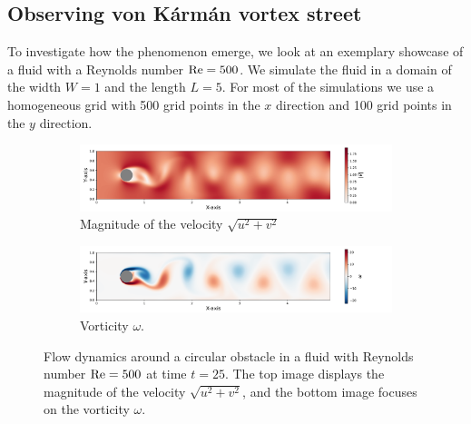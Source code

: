 \subsection{Observing von Kármán vortex street}
To investigate how the phenomenon emerge, we look at an exemplary showcase of a fluid with a Reynolds number $\mathrm{Re} = 500$. We simulate the fluid in a domain of the width $W = 1$ and the length $L = 5$. For most of the simulations we use a homogeneous grid with 500 grid points in the $x$ direction and 100 grid points in the $y$ direction.
\begin{figure}[!htb]
    \centering
    \hspace*{0.7cm}
    \begin{subfigure}[b]{\linewidth} %
        \includegraphics[width=\linewidth]{0_graphics/numeric/absV_25_sim.pdf}
        \caption{Magnitude of the velocity $\sqrt{u^2+v^2}$}
        \label{fig:abs_velocity_25}
    \end{subfigure}
    \vspace{1em} %
    \hspace*{0.7cm}
    \begin{subfigure}[b]{\linewidth} %
        \includegraphics[width=\linewidth]{0_graphics/numeric/vor_25_sim.pdf} %
        \caption{Vorticity $\omega$.}
        \label{fig:vorticity_25}
    \end{subfigure}
    \vspace{-15pt}
    \caption{Flow dynamics around a circular obstacle in a fluid with Reynolds number $\mathrm{Re} = 500$ at time $t=25$. The top image displays the magnitude of the velocity $\sqrt{u^2+v^2}$, and the bottom image focuses on the vorticity $\omega$.}
    \label{fig:first_karman}
\end{figure}
